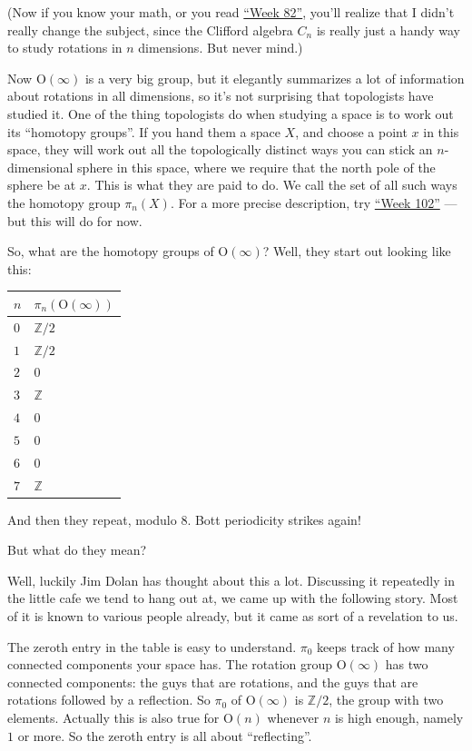 \documentclass{article}
\begin{document}
(Now if you know your math, or you read
\protect\hyperlink{week82}{``Week 82''}, you'll realize that I didn't
really change the subject, since the Clifford algebra \(C_n\) is really
just a handy way to study rotations in \(n\) dimensions. But never
mind.)

Now \(\mathrm{O}(\infty)\) is a very big group, but it elegantly
summarizes a lot of information about rotations in all dimensions, so
it's not surprising that topologists have studied it. One of the thing
topologists do when studying a space is to work out its ``homotopy
groups''. If you hand them a space \(X\), and choose a point \(x\) in
this space, they will work out all the topologically distinct ways you
can stick an \(n\)-dimensional sphere in this space, where we require
that the north pole of the sphere be at \(x\). This is what they are
paid to do. We call the set of all such ways the homotopy group
\(\pi_n(X)\). For a more precise description, try
\protect\hyperlink{week102}{``Week 102''} --- but this will do for now.

So, what are the homotopy groups of \(\mathrm{O}(\infty)\)? Well, they
start out looking like this:

\begin{longtable}[]{@{}ll@{}}
\toprule
\(n\) & \(\pi_n(\mathrm{O}(\infty))\)\tabularnewline
\midrule
\endhead
\(0\) & \(\mathbb{Z}/2\)\tabularnewline
\(1\) & \(\mathbb{Z}/2\)\tabularnewline
\(2\) & \(0\)\tabularnewline
\(3\) & \(\mathbb{Z}\)\tabularnewline
\(4\) & \(0\)\tabularnewline
\(5\) & \(0\)\tabularnewline
\(6\) & \(0\)\tabularnewline
\(7\) & \(\mathbb{Z}\)\tabularnewline
\bottomrule
\end{longtable}

And then they repeat, modulo 8. Bott periodicity strikes again!

But what do they mean?

Well, luckily Jim Dolan has thought about this a lot. Discussing it
repeatedly in the little cafe we tend to hang out at, we came up with
the following story. Most of it is known to various people already, but
it came as sort of a revelation to us.

The zeroth entry in the table is easy to understand. \(\pi_0\) keeps
track of how many connected components your space has. The rotation
group \(\mathrm{O}(\infty)\) has two connected components: the guys that
are rotations, and the guys that are rotations followed by a reflection.
So \(\pi_0\) of \(\mathrm{O}(\infty)\) is \(\mathbb{Z}/2\), the group
with two elements. Actually this is also true for \(\mathrm{O}(n)\)
whenever \(n\) is high enough, namely \(1\) or more. So the zeroth entry
is all about ``reflecting''.
\end{document}
